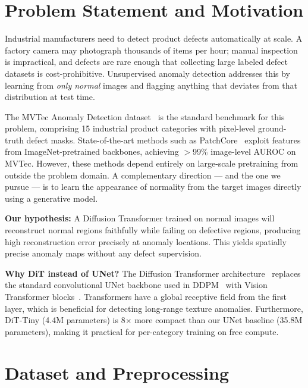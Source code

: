 \documentclass[11pt,letterpaper]{article}
\newcommand{\auroc}{\textsc{AUROC}}
\begin{document}
\tableofcontents
\newpage

\section{Problem Statement and Motivation}

Industrial manufacturers need to detect product defects automatically at scale.
A factory camera may photograph thousands of items per hour; manual inspection is
impractical, and defects are rare enough that collecting large labeled defect datasets
is cost-prohibitive. Unsupervised anomaly detection addresses this by learning from
\emph{only normal} images and flagging anything that deviates from that distribution
at test time.

The MVTec Anomaly Detection dataset~\cite{mvtec2019} is the standard benchmark for
this problem, comprising 15 industrial product categories with pixel-level ground-truth
defect masks. State-of-the-art methods such as PatchCore~\cite{patchcore2022} exploit
features from ImageNet-pretrained backbones, achieving $>$99\% image-level \auroc{}
on MVTec. However, these methods depend entirely on large-scale pretraining from outside
the problem domain. A complementary direction --- and the one we pursue --- is to learn
the appearance of normality from the target images directly using a generative model.

\textbf{Our hypothesis:} A Diffusion Transformer trained on normal images will reconstruct
normal regions faithfully while failing on defective regions, producing high reconstruction
error precisely at anomaly locations. This yields spatially precise anomaly maps without
any defect supervision.

\textbf{Why DiT instead of UNet?} The Diffusion Transformer architecture~\cite{dit2023}
replaces the standard convolutional UNet backbone used in DDPM~\cite{ddpm2020} with
Vision Transformer blocks~\cite{vit2021}. Transformers have a global receptive field from
the first layer, which is beneficial for detecting long-range texture anomalies. Furthermore,
DiT-Tiny (4.4M parameters) is 8$\times$ more compact than our UNet baseline (35.8M
parameters), making it practical for per-category training on free compute.

\section{Dataset and Preprocessing}
\end{document}
